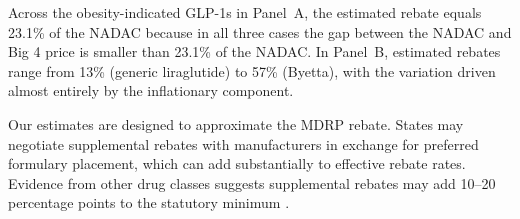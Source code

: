 Across the obesity-indicated GLP-1s in Panel~A, the estimated rebate equals 23.1\% of the NADAC because in all three cases the gap between the NADAC and Big 4 price is smaller than 23.1\% of the NADAC. In Panel~B, estimated rebates range from 13\% (generic liraglutide) to 57\% (Byetta), with the variation driven almost entirely by the inflationary component.



Our estimates are designed to approximate the MDRP rebate. States may negotiate supplemental rebates with manufacturers in exchange for preferred formulary placement, which can add substantially to effective rebate rates. Evidence from other drug classes suggests supplemental rebates may add 10--20 percentage points to the statutory minimum \citep{macpac2019rebates}. 




